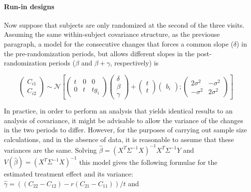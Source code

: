 \documentclass[final, paper=letter,5p,times,twocolumn]{elsarticle}
\theoremstyle{definition}
\begin{document}
\paragraph{Run-in designs}{Now suppose that subjects are only randomized at the second of the three visits. Assuming the same within-subject covariance structure, as the previouse paragraph, a model for the consecutive changes that forces a common slope ($\delta$) in the pre-randomization periods, but allows different slopes in the post-randomization periods ($\beta$ and $\beta+\gamma$, respectively) is

  \begin{equation*}
    \left(
    \begin{array}{c}
      C_{i1} \\
      C_{i2}
    \end{array}
    \right) \sim \mathcal{N}\left[ \left(
      \begin{array}{ccc}
        t & 0 & 0 \\
        0 & t & tg_{i}
      \end{array}
      \right) \left(
      \begin{array}{c}
        \delta \\
        \beta \\
        \gamma
      \end{array}
      \right) + \left(
      \begin{array}{c}
        t \\
        t
      \end{array}
      \right) \left(
      \begin{array}{c}
        b_{i}
      \end{array}
      \right) ; \left(
  \begin{array}{cc}
    2\sigma^{2} & -\sigma^{2} \\
    -\sigma^{2} & 2\sigma^{2}
  \end{array}
  \right) \right]
  \end{equation*}

  In practice, in order to perform an analysis that yields identical results to an analysis of covariance, it might be advisable to allow the variance of the changes in the two periods to differ. However, for the purposes of carrying out sample size calculations, and in the absence of data, it is reasonable to assume that these variances are the same. Solving $\hat{\beta} = (X^{T}\Sigma^{-1}X)^{-1}X^{T}\Sigma^{-1}Y$ and $V(\hat{\beta}) = (X^{T}\Sigma^{-1}X)^{-1}$ this model gives the following formulae for the estimated treatment effect and its variance: $\hat{\gamma} = ((C_{22} - C_{12})-r(C_{21} - C_{11}))/t$ and

}
\end{document}
